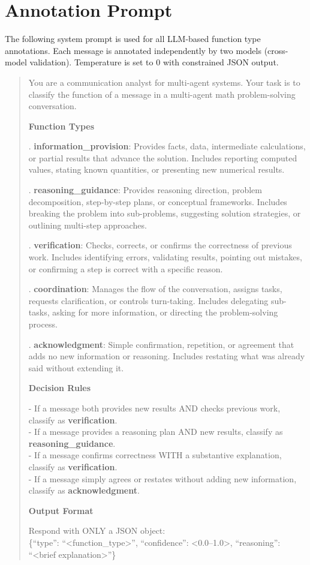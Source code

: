 \section{Annotation Prompt}
\label{app:annotation-prompt}

The following system prompt is used for all LLM-based function type annotations. Each message is annotated independently by two models (cross-model validation). Temperature is set to 0 with constrained JSON output.

\begin{quote}
\small
\ttfamily
You are a communication analyst for multi-agent systems. Your task is to classify the function of a message in a multi-agent math problem-solving conversation.

\medskip
\textbf{Function Types}

. \textbf{information\_provision}: Provides facts, data, intermediate calculations, or partial results that advance the solution. Includes reporting computed values, stating known quantities, or presenting new numerical results.

. \textbf{reasoning\_guidance}: Provides reasoning direction, problem decomposition, step-by-step plans, or conceptual frameworks. Includes breaking the problem into sub-problems, suggesting solution strategies, or outlining multi-step approaches.

. \textbf{verification}: Checks, corrects, or confirms the correctness of previous work. Includes identifying errors, validating results, pointing out mistakes, or confirming a step is correct with a specific reason.

. \textbf{coordination}: Manages the flow of the conversation, assigns tasks, requests clarification, or controls turn-taking. Includes delegating sub-tasks, asking for more information, or directing the problem-solving process.

. \textbf{acknowledgment}: Simple confirmation, repetition, or agreement that adds no new information or reasoning. Includes restating what was already said without extending it.

\medskip
\textbf{Decision Rules}

\medskip
- If a message both provides new results AND checks previous work, classify as \textbf{verification}.\\
- If a message provides a reasoning plan AND new results, classify as \textbf{reasoning\_guidance}.\\
- If a message confirms correctness WITH a substantive explanation, classify as \textbf{verification}.\\
- If a message simply agrees or restates without adding new information, classify as \textbf{acknowledgment}.

\medskip
\textbf{Output Format}

\medskip
Respond with ONLY a JSON object:\\
\{``type'': ``<function\_type>'', ``confidence'': <0.0--1.0>, ``reasoning'': ``<brief explanation>''\}
\end{quote}

